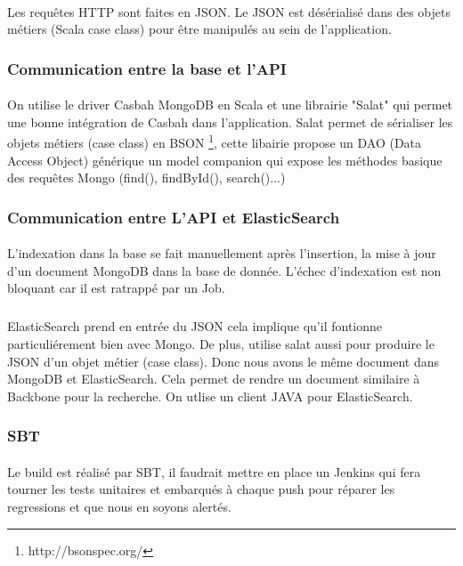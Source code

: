 \paragraph{}
Les requêtes HTTP sont faites en JSON.
Le JSON est désérialisé dans des objets métiers 
(Scala case class) pour être manipulés au sein de l'application.
\subsubsection{Communication entre la base et l'API}
\paragraph{}
On utilise le driver Casbah MongoDB en Scala et une librairie "Salat" qui permet une bonne intégration de Casbah dans l'application.
Salat permet de sérialiser les objets métiers (case class) en BSON \footnote{http://bsonspec.org/}, cette libairie propose un DAO (Data Access Object) générique un model companion qui expose les méthodes basique des requêtes Mongo (find(), findById(), search()...)
\subsubsection{Communication entre L'API et ElasticSearch}
\paragraph{}
L'indexation dans la base se fait manuellement après l'insertion, la mise à jour d'un document MongoDB dans la base de donnée.
L'échec d'indexation est non bloquant car il est ratrappé par un Job.
\subparagraph{}
ElasticSearch prend en entrée du JSON cela implique qu'il fontionne particuliérement bien avec Mongo.
De plus, utilise salat aussi pour produire le JSON d'un objet métier (case class).
Donc nous avons le même document dans MongoDB et ElasticSearch. Cela permet de rendre un document similaire à Backbone pour la recherche.
On utlise un client JAVA pour ElasticSearch.
\subsubsection{SBT}
\paragraph{}
Le build est réalisé par SBT, il faudrait mettre en place un Jenkins qui fera tourner les tests unitaires et embarqués à chaque push pour réparer les regressions et que nous en soyons alertés.
